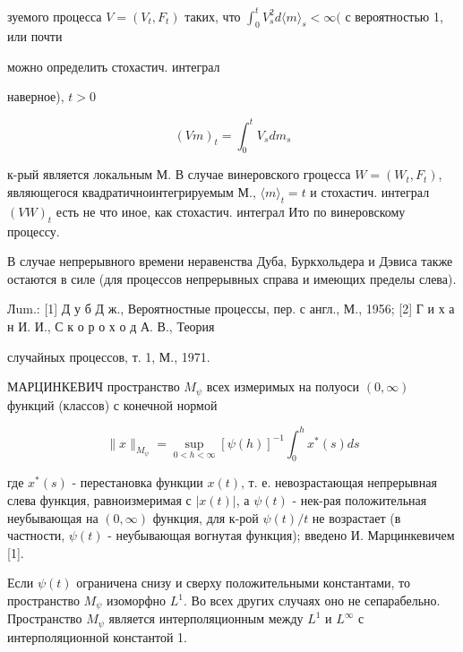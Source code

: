 \documentclass[10pt]{article}
\begin{document}
зуемого процесса $V=\left(V_{t}, F_{t}\right)$ таких, что $\int_{0}^{t} V_{s}^{2} d\langle m\rangle_{s}<\infty($ с вероятностью 1, или почти



можно определить стохастич. интеграл



наверное), $t>0$



\[

(V m)_{t}=\int_{0}^{t} V_{s} d m_{s}

\]



к-рый является локальным М. В случае винеровского гроцесса $W=\left(W_{t}, F_{t}\right)$, являющегося квадратичноинтегрируемым М., $\langle m\rangle_{t}=t$ и стохастич. интеграл $(V W)_{t}$ есть не что иное, как стохастич. интеграл Ито по винеровскому процессу.



В случае непрерывного времени неравенства Дуба, Буркхольдера и Дэвиса также остаются в силе (для процессов непрерывных справа и имеющих пределы слева).



Лum.: [1] Д у б Д ж., Вероятностные процессы, пер. с англ., М., 1956; [2] Г и х а н И. И., С к о р о х о д А. В., Теория

случайных процессов, т. 1, М., 1971.



МАРЦИНКЕВИЧ пространство $M_{\psi}$ всех измеримых на полуоси $(0, \infty)$ функций (классов) с конечной нормой



\[

\|x\|_{M_{\psi}}=\sup _{0<h<\infty}[\psi(h)]^{-1} \int_{0}^{h} x^{*}(s) d s

\]



где $x^{*}(s)$ - перестановка функции $x(t)$, т. е. невозрастающая непрерывная слева функция, равноизмеримая с $|x(t)|$, а $\psi(t)$ - нек-рая положительная неубывающая на $(0, \infty)$ функция, для к-рой $\psi(t) / t$ не возрастает (в частности, $\psi(t)$ - неубывающая вогнутая функция); введено И. Марцинкевичем [1].



Если $\psi(t)$ ограничена снизу и сверху положительными константами, то пространство $M_{\psi}$ изоморфно $L^{1}$. Во всех других случаях оно не сепарабельно. Пространство $M_{\psi}$ является интерполяционным между $L^{1}$ и $L^{\infty}$ с интерполяционной константой 1.
\end{document}
